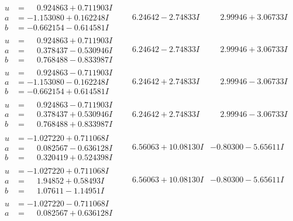 \documentclass[1p]{elsarticle_modified}
\theoremstyle{definition}
\begin{document}
$$\begin{array}{c|c|c}
\begin{aligned}
u &= \phantom{-}0.924863 + 0.711903 I \\
a &= -1.153080 + 0.162248 I \\
b &= -0.662154 - 0.614581 I\end{aligned}
 & \phantom{-}6.24642 - 2.74833 I & \phantom{-}2.99946 + 3.06733 I \\ \hline\begin{aligned}
u &= \phantom{-}0.924863 + 0.711903 I \\
a &= \phantom{-}0.378437 - 0.530946 I \\
b &= \phantom{-}0.768488 - 0.833987 I\end{aligned}
 & \phantom{-}6.24642 - 2.74833 I & \phantom{-}2.99946 + 3.06733 I \\ \hline\begin{aligned}
u &= \phantom{-}0.924863 - 0.711903 I \\
a &= -1.153080 - 0.162248 I \\
b &= -0.662154 + 0.614581 I\end{aligned}
 & \phantom{-}6.24642 + 2.74833 I & \phantom{-}2.99946 - 3.06733 I \\ \hline\begin{aligned}
u &= \phantom{-}0.924863 - 0.711903 I \\
a &= \phantom{-}0.378437 + 0.530946 I \\
b &= \phantom{-}0.768488 + 0.833987 I\end{aligned}
 & \phantom{-}6.24642 + 2.74833 I & \phantom{-}2.99946 - 3.06733 I \\ \hline\begin{aligned}
u &= -1.027220 + 0.711068 I \\
a &= \phantom{-}0.082567 - 0.636128 I \\
b &= \phantom{-}0.320419 + 0.524398 I\end{aligned}
 & \phantom{-}6.56063 + 10.08130 I & -0.80300 - 5.65611 I \\ \hline\begin{aligned}
u &= -1.027220 + 0.711068 I \\
a &= \phantom{-}1.94852 + 0.58493 I \\
b &= \phantom{-}1.07611 - 1.14951 I\end{aligned}
 & \phantom{-}6.56063 + 10.08130 I & -0.80300 - 5.65611 I \\ \hline\begin{aligned}
u &= -1.027220 - 0.711068 I \\
a &= \phantom{-}0.082567 + 0.636128 I \\

\end{aligned}
\end{array}$$
\end{document}
